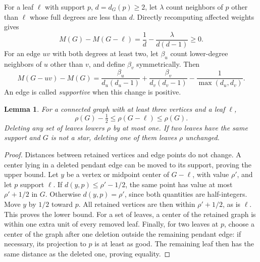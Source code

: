 \documentclass[11pt,a4paper]{article}
\newtheorem{lemma}[theorem]{Lemma}
\theoremstyle{definition}\newtheorem{definition}[theorem]{Definition}
\theoremstyle{remark}\newtheorem{remark}[theorem]{Remark}
\begin{document}
For a leaf $\ell$ with support $p$, $d=d_G(p)\ge2$, let $\lambda$ count
neighbors of $p$ other than $\ell$ whose full degrees are less than $d$.
Directly recomputing affected weights gives
\begin{equation}\label{eq:g7-leaf}
 M(G)-M(G-\ell)=\frac1d-\frac\lambda{d(d-1)}\ge0.
\end{equation}
For an edge $uv$ with both degrees at least two, let $\beta_u$ count
lower-degree neighbors of $u$ other than $v$, and define $\beta_v$
symmetrically. Then
\begin{equation}\label{eq:g7-edge}
 M(G-uv)-M(G)=
 \frac{\beta_u}{d_u(d_u-1)}+
 \frac{\beta_v}{d_v(d_v-1)}-\frac1{\max(d_u,d_v)}.
\end{equation}
An edge is called \emph{supportive} when this change is positive.

\begin{lemma}\label{lem:g7-leafmetric}
For a connected graph with at least three vertices and a leaf $\ell$,
\[
 \rho(G)-\tfrac12\le\rho(G-\ell)\le\rho(G).
\]
Deleting any set of leaves lowers $\rho$ by at most one. If two leaves
have the same support and $G$ is not a star, deleting one of them leaves
$\rho$ unchanged.
\end{lemma}
\begin{proof}
Distances between retained vertices and edge points do not change.
A center lying in a deleted pendant edge can be moved to its support,
proving the upper bound. Let $y$ be a vertex or midpoint center of
$G-\ell$, with value $\rho'$, and let $p$ support $\ell$. If
$d(y,p)\le\rho'-1/2$, the same point has value at most $\rho'+1/2$ in
$G$. Otherwise $d(y,p)=\rho'$, since both quantities are half-integers.
Move $y$ by $1/2$ toward $p$. All retained vertices are then within
$\rho'+1/2$, as is $\ell$. This proves the lower bound. For a set of
leaves, a center of the retained graph is within one extra unit of
every removed leaf. Finally, for two leaves at $p$, choose a center
of the graph after one deletion outside the remaining pendant edge:
if necessary, its projection to $p$ is at least as good. The remaining
leaf then has the same distance as the deleted one, proving equality.
\end{proof}
\end{document}
